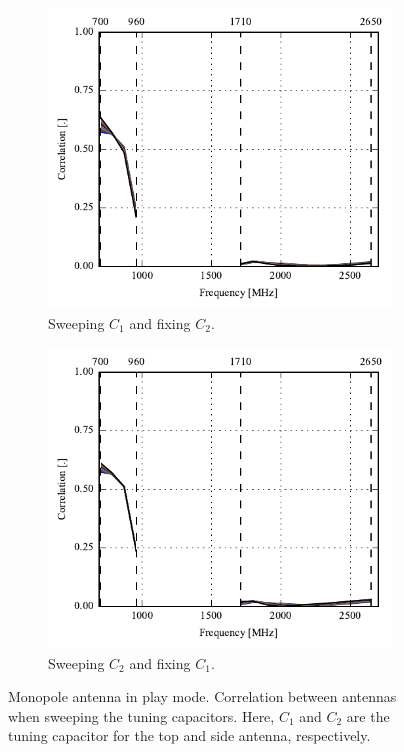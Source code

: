 \begin{figure}[htbp]
    \centering
    \begin{subfigure}{0.49\linewidth}
        \includegraphics{img/tech_sol/monopole/play_mode/s11_corr}
        \caption{Sweeping $C_1$ and fixing $C_2$.}
    \end{subfigure}
    \hfill
    \begin{subfigure}{0.49\linewidth}
        \includegraphics{img/tech_sol/monopole/play_mode/s22_corr}
        \caption{Sweeping $C_2$ and fixing $C_1$.}
    \end{subfigure}
    \caption{Monopole antenna in play mode. Correlation between antennas when sweeping the tuning capacitors. Here, $C_1$ and $C_2$ are the tuning capacitor for the top and side antenna, respectively.}
    \label{fig:corr_sol1_play}
\end{figure}

